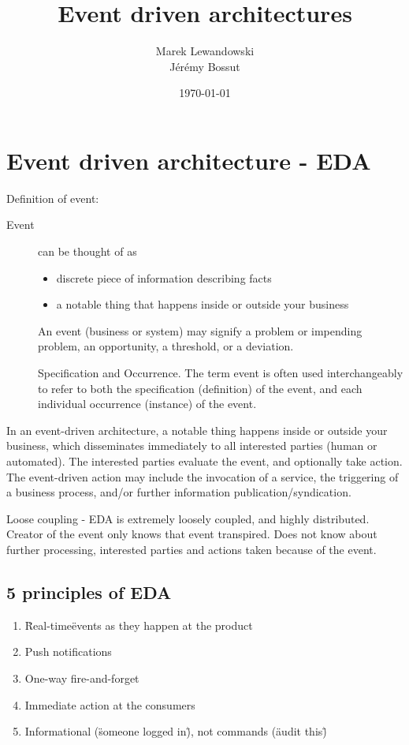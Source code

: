 \documentclass[12pt, a4paper]{article}
\author{Marek Lewandowski \\ Jérémy Bossut}
\date{\today}
\title{Event driven architectures}
\begin{document}
\maketitle
\newpage

\section{Event driven architecture - EDA}
Definition of event:

\begin{description}
\item[Event] can be thought of as
\begin{itemize}
 \item discrete piece of information describing facts
 \item a notable thing that happens inside or outside your business
 \end{itemize}

 An event (business or system) may signify a problem or impending problem, an opportunity, a threshold, or a deviation.

 Specification and Occurrence. The term event is often used interchangeably to refer to both the specification (definition) of the event, and each individual occurrence (instance) of the event.

\end{description}

In an event-driven architecture, a notable thing happens inside or outside your business, which disseminates immediately to all interested parties (human or automated). The interested parties evaluate the event, and optionally take action. The event-driven action may include the invocation of a service, the triggering of a business process, and/or further information publication/syndication.

Loose coupling - EDA is extremely loosely coupled, and highly distributed. Creator of the event only knows that event transpired. Does not know about further processing, interested parties and actions taken because of the event.

\subsection{5 principles of EDA}
\begin{enumerate}
\item \"Real-time\" events as they happen at the product
\item Push notifications
\item One-way fire-and-forget
\item Immediate action at the consumers 
\item Informational (\"someone logged in\"), not commands (\"audit this\") 
\end{enumerate}
\end{document}
